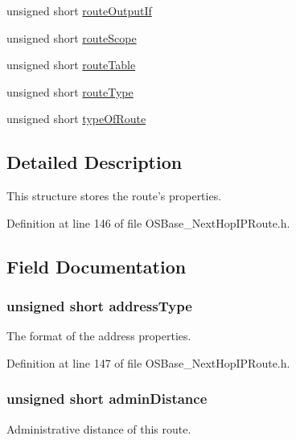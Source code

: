 \begin{DoxyCompactItemize}
\item 
unsigned short \hyperlink{structnext_hop_i_p_a1adf02684891a082470b3a10021902f7}{routeOutputIf}
\item 
unsigned short \hyperlink{structnext_hop_i_p_a6a7d3b876bf469fad2abd9845de6171d}{routeScope}
\item 
unsigned short \hyperlink{structnext_hop_i_p_a5238a1e177a50a51c5fd346af46505c3}{routeTable}
\item 
unsigned short \hyperlink{structnext_hop_i_p_ae54e153a6448e2a1c78aae45a335f646}{routeType}
\item 
unsigned short \hyperlink{structnext_hop_i_p_a8aba433e1b002b6710551fc1c35ad0ef}{typeOfRoute}
\end{DoxyCompactItemize}


\subsection{Detailed Description}
This structure stores the route's properties. 

Definition at line 146 of file OSBase\_\-NextHopIPRoute.h.

\subsection{Field Documentation}
\hypertarget{structnext_hop_i_p_af07a5d040575969e5e19b6a29fbedecb}{
\subsubsection[{addressType}]{\setlength{\rightskip}{0pt plus 5cm}unsigned short {\bf addressType}}}
\label{structnext_hop_i_p_af07a5d040575969e5e19b6a29fbedecb}
The format of the address properties. 

Definition at line 147 of file OSBase\_\-NextHopIPRoute.h.\hypertarget{structnext_hop_i_p_a04a2bada9ddc3f7e34c674fd0a6ba1e2}{
\subsubsection[{adminDistance}]{\setlength{\rightskip}{0pt plus 5cm}unsigned short {\bf adminDistance}}}
\label{structnext_hop_i_p_a04a2bada9ddc3f7e34c674fd0a6ba1e2}
Administrative distance of this route. 

